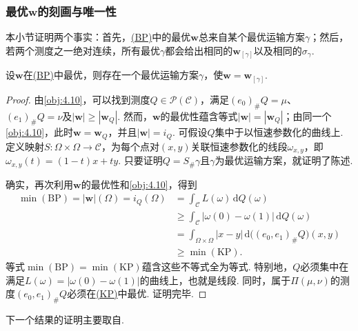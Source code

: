 \subsubsection[最优流的刻画与唯一性]{最优$\mathbf w$的刻画与唯一性}\label{sec:4.2.5}

本小节证明两个事实：首先，\hyperref[obj:4.5]{(BP)}中的最优$\mathbf w$总来自某个最优运输方案$\gamma$；然后，若两个测度之一绝对连续，所有最优$\gamma$都会给出相同的$\mathbf w_{[\gamma]}$以及相同的$\sigma_\gamma$.

\begin{theorem}\label{obj:4.13}
设$\mathbf w$在\hyperref[obj:4.5]{(BP)}中最优，则存在一个最优运输方案$\gamma$，使$\mathbf w=\mathbf w_{[\gamma]}$.
\end{theorem}
\begin{proof}
由\autoref{obj:4.10}，可以找到测度$Q\in\mathscr P(\mathscr C)$，满足$(e_0)_\#Q=\mu$、$(e_1)_\#Q=\nu$及$|\mathbf w|\geq|\mathbf w_Q|$. 然而，$\mathbf w$的最优性蕴含等式$|\mathbf w|=|\mathbf w_Q|$；由同一个\autoref{obj:4.10}，此时$\mathbf w=\mathbf w_Q$，并且$|\mathbf w|=i_Q$. 可假设$Q$集中于以恒速参数化的曲线上. 定义映射$S:\Omega\times\Omega\to\mathscr C$，为每个点对$(x,y)$关联恒速参数化的线段$\omega_{x,y}$，即$\omega_{x,y}(t)=(1-t)x+ty$. 只要证明$Q=S_\#\gamma$且$\gamma$为最优运输方案，就证明了陈述.

确实，再次利用$\mathbf w$的最优性和\autoref{obj:4.10}，得到
\begin{equation*}
\begin{aligned}
 \min\hyperref[obj:4.5]{(\mathrm{BP})}=|\mathbf w|(\Omega)=i_Q(\Omega)
 &=\int_{\mathscr C}L(\omega)\,\mathrm dQ(\omega)\\
 &\geq\int_{\mathscr C}|\omega(0)-\omega(1)|\,\mathrm dQ(\omega)\\
 &=\int_{\Omega\times\Omega}|x-y|\,\mathrm d\bigl((e_0,e_1)_\#Q\bigr)(x,y)\\
 &\geq\min\hyperref[obj:1.2]{(\mathrm{KP})}.
\end{aligned}
\end{equation*}
等式$\min\hyperref[obj:4.5]{(\mathrm{BP})}=\min\hyperref[obj:1.2]{(\mathrm{KP})}$蕴含这些不等式全为等式. 特别地，$Q$必须集中在满足$L(\omega)=|\omega(0)-\omega(1)|$的曲线上，也就是线段. 同时，属于$\Pi(\mu,\nu)$的测度$(e_0,e_1)_\#Q$必须在\hyperref[obj:1.2]{(KP)}中最优. 证明完毕.
\end{proof}

下一个结果的证明主要取自\cite{b8}.

